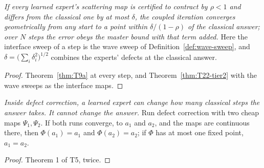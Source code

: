 \begin{theorem}\label{thm:headline-tier2}
  \leanok
  \emph{If every learned expert's scattering map is certified to contract by
  $\rho<1$ and differs from the classical one by at most $\delta$, the coupled
  iteration converges geometrically from any start to a point within
  $\delta/(1-\rho)$ of the classical answer; over $N$ steps the error obeys
  the master bound with that term added.}  Here the interface sweep of a step
  is the wave sweep of Definition~\ref{def:wave-sweep}, and
  $\delta=\bigl(\sum_i\delta_i^2\bigr)^{1/2}$ combines the experts' defects at
  the classical answer.
\end{theorem}

\begin{proof}
  \leanok
  Theorem~\ref{thm:T9a} at every step, and Theorem~\ref{thm:T22-tier2} with
  the wave sweeps as the interface maps.
\end{proof}

\begin{theorem}\label{thm:headline-dc}
  \leanok
  \emph{Inside defect correction, a learned expert can change how many
  classical steps the answer takes.  It cannot change the answer.}  Run defect
  correction with two cheap maps $\Psi_1,\Psi_2$.  If both runs converge, to
  $a_1$ and $a_2$, and the maps are continuous there, then
  $\Phi(a_1)=a_1$ and $\Phi(a_2)=a_2$; if $\Phi$ has at most one fixed point,
  $a_1=a_2$.
\end{theorem}

\begin{proof}
  \leanok
  Theorem 1 of T5, twice.
\end{proof}

